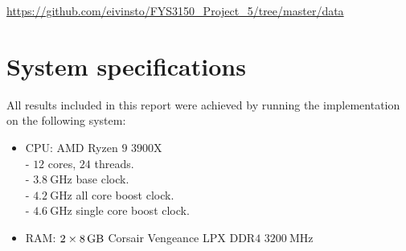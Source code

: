 \documentclass[reprint,english,notitlepage]{revtex4-1}  %
\begin{document}
\url{https://github.com/eivinsto/FYS3150_Project_5/tree/master/data}

\newpage
\section{System specifications} \label{C}
All results included in this report were achieved by running the implementation on the following system:

\begin{itemize}
	\item CPU: AMD Ryzen \(9\) \(3900\)X \\
		- \(12\) cores, \(24\) threads. \\ 
		- \(\SI{3.8}{\giga\hertz}\) base clock. \\
		- \(\SI{4.2}{\giga\hertz}\) all core boost clock. \\
		- \(\SI{4.6}{\giga\hertz}\) single core boost clock. \\
	\item RAM: \(2\times\SI{8}{\giga\byte}\) Corsair Vengeance LPX DDR\(4\) \(\SI{3200}{\mega\hertz}\)
\end{itemize}
\end{document}
